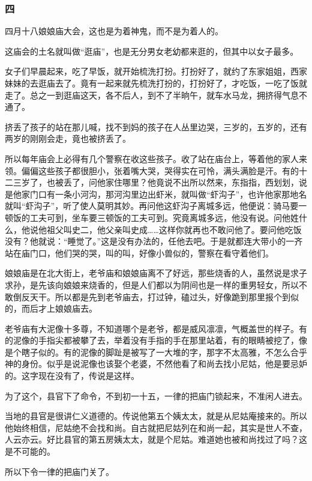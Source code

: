\subsubsection*{四}
\par 四月十八娘娘庙大会，这也是为着神鬼，而不是为着人的。
\par 这庙会的土名就叫做“逛庙”，也是无分男女老幼都来逛的，但其中以女子最多。
\par 女子们早晨起来，吃了早饭，就开始梳洗打扮。打扮好了，就约了东家姐姐，西家妹妹的去逛庙去了。竟有一起来就先梳洗打扮的，打扮好了，才吃饭，一吃了饭就走了。总之一到逛庙这天，各不后人，到不了半晌午，就车水马龙，拥挤得气息不通了。
\par 挤丢了孩子的站在那儿喊，找不到妈的孩子在人丛里边哭，三岁的，五岁的，还有两岁的刚刚会走，竟也被挤丢了。
\par 所以每年庙会上必得有几个警察在收这些孩子。收了站在庙台上，等着他的家人来领。偏偏这些孩子都很胆小，张着嘴大哭，哭得实在可怜，满头满脸是汗。有的十二三岁了，也被丢了，问他家住哪里？他竟说不出所以然来，东指指，西划划，说是他家门口有一条小河沟，那河沟里边出虾米，就叫做“虾沟子”，也许他家那地名就叫“虾沟子”，听了使人莫明其妙。再问他这虾沟子离城多远，他便说：骑马要一顿饭的工夫可到，坐车要三顿饭的工夫可到。究竟离城多远，他没有说。问他姓什么，他说他祖父叫史二，他父亲叫史成……这样你就再也不敢问他了。要问他吃饭没有？他就说：“睡觉了。”这是没有办法的，任他去吧。于是就都连大带小的一齐站在庙门口，他们哭的哭，叫的叫，好像小兽似的，警察在看守着他们。
\par 娘娘庙是在北大街上，老爷庙和娘娘庙离不了好远，那些烧香的人，虽然说是求子求孙，是先该向娘娘来烧香的，但是人们都以为阴间也是一样的重男轻女，所以不敢倒反天干。所以都是先到老爷庙去，打过钟，磕过头，好像跪到那里报个到似的，而后才上娘娘庙去。
\par 老爷庙有大泥像十多尊，不知道哪个是老爷，都是威风凛凛，气概盖世的样子。有的泥像的手指尖都被攀了去，举着没有手指的手在那里站着，有的眼睛被挖了，像是个瞎子似的。有的泥像的脚趾是被写了一大堆的字，那字不太高雅，不怎么合乎神的身份。似乎是说泥像也该娶个老婆，不然他看了和尚去找小尼姑，他是要忌妒的。这字现在没有了，传说是这样。
\par 为了这个，县官下了命令，不到初一十五，一律的把庙门锁起来，不准闲人进去。
\par 当地的县官是很讲仁义道德的。传说他第五个姨太太，就是从尼姑庵接来的。所以他始终相信，尼姑绝不会找和尚。自古就把尼姑列在和尚一起，其实是世人不查，人云亦云。好比县官的第五房姨太太，就是个尼姑。难道她也被和尚找过了吗？这是不可能的。
\par 所以下令一律的把庙门关了。

